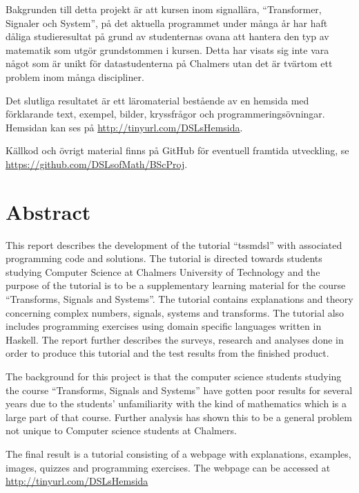 \documentclass[12pt,a4paper,twoside,openright]{article}
\begin{document}
Bakgrunden till detta projekt är att kursen inom signallära,
``Transformer, Signaler och System'', på det aktuella programmet under
många år har haft dåliga studieresultat på grund av studenternas ovana
att hantera den typ av matematik som utgör grundstommen i
kursen. Detta har visats sig inte vara något som är unikt för
data\-studenterna på Chalmers utan det är tvärtom ett problem inom många
discipliner.

Det slutliga resultatet är ett läromaterial bestående av en hemsida med
förklarande text, exempel, bilder, kryssfrågor och programmeringsövningar.
Hemsidan kan ses på \url{http://tinyurl.com/DSLsHemsida}.

Källkod och övrigt material finns på GitHub för eventuell framtida utveckling, se
\url{https://github.com/DSLsofMath/BScProj}.

\newpage

\thispagestyle{plain}

\section*{Abstract}

This report describes the development of the tutorial
``\gls{tssmdsl}'' with associated programming code and solutions. The
tutorial is directed towards students studying Computer Science at
Chalmers University of Technology and the purpose of the tutorial is
to be a supplementary learning material for the course ``Transforms,
Signals and Systems''. The tutorial contains explanations and theory
concerning complex numbers, signals, systems and transforms. The
tutorial also includes programming exercises using domain specific
languages written in Haskell. The report further describes the
surveys, research and analyses done in order to produce this tutorial
and the test results from the finished product.

The background for this project is that the computer science students
studying the course ``Transforms, Signals and Systems'' have gotten
poor results for several years due to the students' unfamiliarity with
the kind of mathematics which is a large part of that course. Further
analysis has shown this to be a general problem not unique to Computer
science students at Chalmers.

The final result is a tutorial consisting of a webpage with
explanations, examples, images, quizzes and programming
exercises. The webpage can be accessed at \\
\url{http://tinyurl.com/DSLsHemsida}
\end{document}
